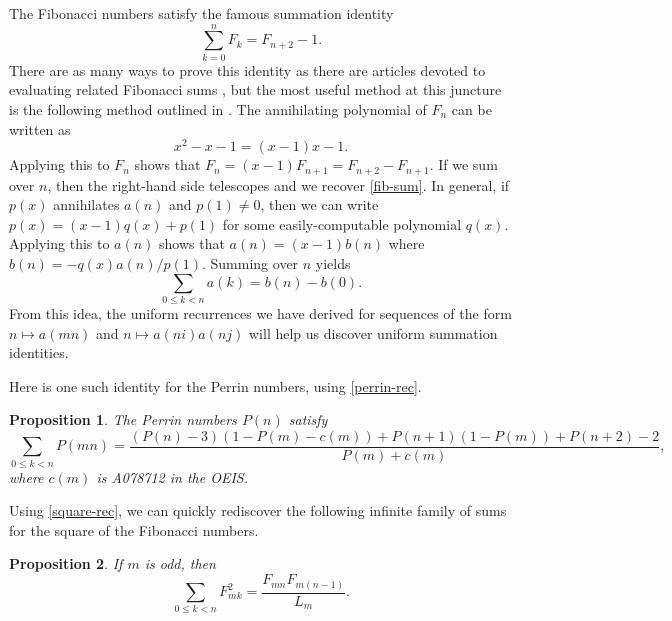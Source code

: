 \documentclass[12pt]{article}
\newtheorem{proposition}{Proposition}
\begin{document}
The Fibonacci numbers satisfy the famous summation identity
\begin{equation}
    \label{fib-sum}
    \sum_{k = 0}^n F_k = F_{n + 2} - 1.
\end{equation}
There are as many ways to prove this identity as there are articles devoted to
evaluating related Fibonacci sums \cite{layman, melham, frontczak}, but the
most useful method at this juncture is the following method outlined in
\cite{concrete}. The annihilating polynomial of $F_n$ can be written as
\begin{equation*}
    x^2 - x - 1 = (x - 1) x - 1.
\end{equation*}
Applying this to $F_n$ shows that $F_n = (x - 1) F_{n + 1} = F_{n + 2} - F_{n +
1}$. If we sum over $n$, then the right-hand side telescopes and we recover
\eqref{fib-sum}. In general, if $p(x)$ annihilates $a(n)$ and $p(1) \neq 0$,
then we can write $p(x) = (x - 1) q(x) + p(1)$ for some easily-computable
polynomial $q(x)$. Applying this to $a(n)$ shows that $a(n) = (x - 1) b(n)$
where $b(n) = -q(x) a(n) / p(1)$. Summing over $n$ yields
\begin{equation*}
    \sum_{0 \leq k < n} a(k) = b(n) - b(0).
\end{equation*}
From this idea, the uniform recurrences we have derived for sequences of the
form $n \mapsto a(mn)$ and $n \mapsto a(ni) a(nj)$ will help us discover
uniform summation identities.

Here is one such identity for the Perrin numbers, using \eqref{perrin-rec}.

\begin{proposition}
    The Perrin numbers $P(n)$ satisfy
    \begin{equation*}
        \sum_{0 \leq k < n} P(mn)
        =
        \frac{(P(n) - 3) (1 - P(m) - c(m)) + P(n + 1) (1 - P(m)) + P(n + 2) - 2}{P(m) + c(m)},
    \end{equation*}
    where $c(m)$ is A078712 in the OEIS.
\end{proposition}

Using \eqref{square-rec}, we can quickly rediscover the following infinite
family of sums for the square of the Fibonacci numbers.

\begin{proposition}
    \label{fib-square-sum}
    If $m$ is odd, then
    \begin{equation*}
        \label{fib-square-sum-eq}
        \sum_{0 \leq k < n} F_{mk}^2 = \frac{F_{mn} F_{m(n - 1)}}{L_m}.
    \end{equation*}
\end{proposition}
\end{document}
